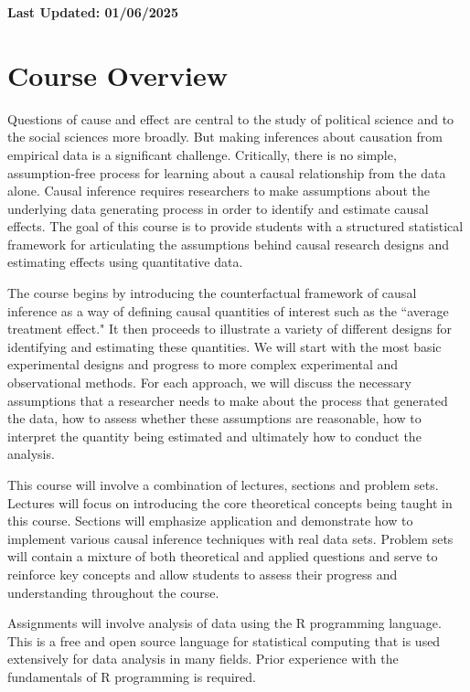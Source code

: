 \documentclass[11pt, article, oneside]{memoir}
\title{{\mytitle}}
\author{\myauthor\smallskip\footnotesize\newline Office: Pick Hall 328, 3rd floor
  \newline Office Hours: Tuesdays 4pm-6pm or schedule an appointment by e-mail \newline
    \myemail \newline \mywebsite
\newline \newline
Teaching Assistant: Cindy Wang\newline
Office Hours: Fridays 1:30pm-2:30pm, Pick 407 \newline
\texttt{\href{mailto:wangxinyu@uchicago.edu}{wangxinyu@uchicago.edu}}
}
\date{}
\theoremstyle{Assumption}
\begin{document}
\maketitle
\textbf{Last Updated: 01/06/2025}
\section*{Course Overview}

Questions of cause and effect are central to the study of political science and to the social sciences more broadly. But making inferences about causation from empirical data is a significant challenge. Critically, there is no simple, assumption-free process for learning about a causal relationship from the data alone. Causal inference requires researchers to make assumptions about the underlying data generating process in order to identify and estimate causal effects. The goal of this course is to provide students with a structured statistical framework for articulating the assumptions behind causal research designs and estimating effects using quantitative data. 

The course begins by introducing the counterfactual framework of causal inference as a way of defining causal quantities of interest such as the ``average treatment effect." It then proceeds to illustrate a variety of different designs for identifying and estimating these quantities. We will start with the most basic experimental designs and progress to more complex experimental and observational methods. For each approach, we will discuss the necessary assumptions that a researcher needs to make about the process that generated the data, how to assess whether these assumptions are reasonable, how to interpret the quantity being estimated and ultimately how to conduct the analysis. 

This course will involve a combination of lectures, sections and problem sets. Lectures will focus on introducing the core theoretical concepts being taught in this course. Sections will emphasize application and demonstrate how to implement various causal inference techniques with real data sets. Problem sets will contain a mixture of both theoretical and applied questions and serve to reinforce key concepts and allow students to assess their progress and understanding throughout the course.

Assignments will involve analysis of data using the R programming language. This is a free and open source language for statistical computing that is used extensively for data analysis in many fields. Prior experience with the fundamentals of R programming is required.
\end{document}

